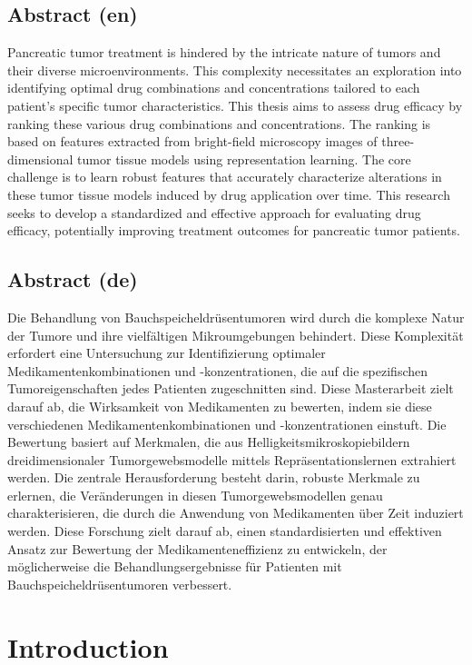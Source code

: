 \documentclass[12pt,twoside,a4paper,parskip]{scrbook} %
\begin{document}
\section*{Abstract (en)}
Pancreatic tumor treatment is hindered by the intricate nature of tumors and their diverse microenvironments. This complexity necessitates an exploration into identifying optimal drug combinations and concentrations tailored to each patient's specific tumor characteristics. This thesis aims to assess drug efficacy by ranking these various drug combinations and concentrations. The ranking is based on features extracted from bright-field microscopy images of three-dimensional tumor tissue models using representation learning. The core challenge is to learn robust features that accurately characterize alterations in these tumor tissue models induced by drug application over time. This research seeks to develop a standardized and effective approach for evaluating drug efficacy, potentially improving treatment outcomes for pancreatic tumor patients.



\section*{Abstract (de)}
Die Behandlung von Bauchspeicheldrüsentumoren wird durch die komplexe Natur der Tumore und ihre vielfältigen Mikroumgebungen behindert. Diese Komplexität erfordert eine Untersuchung zur Identifizierung optimaler Medikamentenkombinationen und -konzentrationen, die auf die spezifischen Tumoreigenschaften jedes Patienten zugeschnitten sind. Diese Masterarbeit zielt darauf ab, die Wirksamkeit von Medikamenten zu bewerten, indem sie diese verschiedenen Medikamentenkombinationen und -konzentrationen einstuft. Die Bewertung basiert auf Merkmalen, die aus Helligkeitsmikroskopiebildern dreidimensionaler Tumorgewebsmodelle mittels Repräsentationslernen extrahiert werden. Die zentrale Herausforderung besteht darin, robuste Merkmale zu erlernen, die Veränderungen in diesen Tumorgewebsmodellen genau charakterisieren, die durch die Anwendung von Medikamenten über Zeit induziert werden. Diese Forschung zielt darauf ab, einen standardisierten und effektiven Ansatz zur Bewertung der Medikamenteneffizienz zu entwickeln, der möglicherweise die Behandlungsergebnisse für Patienten mit Bauchspeicheldrüsentumoren verbessert.
\mainmatter
\let\cleardoublepage\clearpage
\chapter{Introduction}\label{ch:intro}
\end{document}
